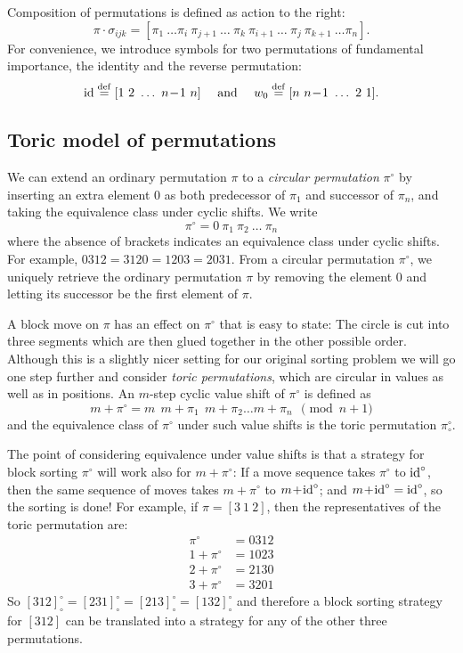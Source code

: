 \documentclass[11pt]{amsart} %
\newcommand{\DEF}{\buildrel {\rm def} \over =}
\newcommand{\id}{\mathop{\rm id}}
\newcommand{\Bid}{{\id}^\circ}
\newcommand{\Bpi}{{\pi}^\circ}
\newcommand{\Tpi}{\Bpi_\circ}
\begin{document}
Composition of permutations is defined as action to the right:
\[
\pi \cdot \sigma_{ijk} =
  [\pi_1\ \dots \pi_i\ \pi_{j+1}\ \dots\ \pi_k\ \pi_{i+1}\ \dots\ \pi_j\
   \pi_{k+1}\ \dots \pi_n].
\]
For convenience, we introduce symbols for two permutations of
fundamental importance, the identity and the reverse permutation:
\[
   \id \DEF [1\ 2\ \dots\ n\!-\!1\ n] \quad\mbox{ and }\quad
   w_0 \DEF [n\ n\!-\!1\ \dots\ 2\ 1].
\]
\noindent

\subsection{Toric model of permutations}
We can extend an ordinary permutation $\pi$ to a {\em circular
permutation} $\Bpi$ by inserting an extra element 0 as both
predecessor of $\pi_1$ and successor of $\pi_n$, and taking
the equivalence class under cyclic shifts.
We write 
\[
   \Bpi = 0\ \pi_1\ \pi_2\ \dots\ \pi_n
\]
where the absence of brackets indicates an equivalence class under cyclic
shifts. For example, $ 0312 = 3120 = 1203
= 2031 $. From a circular permutation $\Bpi$, we uniquely
retrieve the ordinary permutation $\pi$ by removing the element 0
and letting its successor be the first element of $\pi$.

A block move on $\pi$ has an effect on $\Bpi$ that is easy to state:
The circle is cut into
three segments which are then glued together in the other possible
order. Although this is a slightly nicer setting for our original
sorting problem we will  go one step further and consider {\em
toric permutations}, which are circular in values as well as in
positions. An $m$-step cyclic value shift of $\Bpi$ is defined as
$$ m\!+\!\Bpi = m \ \ m\!\!+\!\!\pi_1 \ \ m\!\!+\!\!\pi_2 \ldots
m\!\!+\!\!\pi_n\ \  \pmod{n\!\!+\!\!1} $$ and the
equivalence class of $\Bpi$ under such value shifts is the toric
permutation $\Tpi$.

The point of considering equivalence under value shifts is
that a strategy for block sorting $\Bpi$
will work also for $m\!+\!\Bpi$: If a move sequence takes $\Bpi$
to $\Bid$, then the same sequence of moves takes 
$m\!+\!\Bpi$ to $m\!+\!\Bid$; and $m\!+\!\Bid = \Bid$, so the sorting is
done! For example, if $\pi=[3\ 1\ 2]$, then the representatives of the
toric permutation are: 
\[
\begin{array}{rl}
\Bpi&=0312 \\
1\!+\!\Bpi&=1023 \\
2\!+\!\Bpi&=2130 \\
3\!+\!\Bpi&=3201
\end{array}
\]
So $ {[312]^\circ_\circ}= {[231]^\circ_\circ}=
{[213]^\circ_\circ}= {[132]^\circ_\circ}$ and therefore a block
sorting strategy for $[312]$ can be translated into a strategy for
any of the other three permutations.
\end{document}
